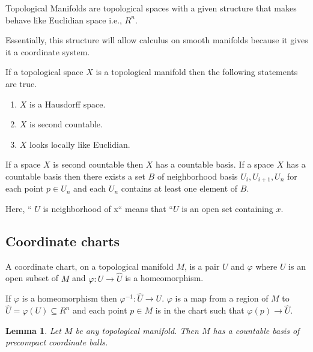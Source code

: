 \documentclass{article}
\newtheorem{lemma}[theorem]{Lemma}
\begin{document}
Topological Manifolds are topological spaces with a given structure that makes behave like Euclidian space i.e., $ R^n $.

Essentially, this structure will allow calculus on smooth manifolds because it gives it a coordinate system.

If a topological space $ X $ is a topological manifold then the following statements are true.

\begin{enumerate}
\item $ X $ is a Hausdorff space.
\item $ X $ is second countable.
\item $ X $ looks locally like Euclidian.
\end{enumerate}

If a space $ X $ is second countable then $ X $ has a countable basis. If a space $ X $ has a countable basis then there exists a set $ B $ of neighborhood basis $ U_{i}, U_{i+1}, U_{n} $ for each point $ p \in U_{n} $ and each $ U_{n} $ contains at least one element of $ B $.

Here, `` $ U $ is neighborhood of x`` means that ``$ U $ is an open set containing $ x $.

\subsection{Coordinate charts}
A coordinate chart, on a topological manifold $ M $, is a pair $ U $ and $ \varphi $ where $ U $ is an open subset of $ M $ and $ \varphi: U \rightarrow \hat{U} $ is a homeomorphism.

If $ \varphi $ is a homeomorphism then $  \varphi^{-1}: \hat{U} \rightarrow U $. $ \varphi $ is a map from a region of $ M $ to  $ \hat{U} = \varphi(U) \subseteq R^n $ and each point $ p \in M $ is in the chart such that $ \varphi(p) \rightarrow \hat{U} $.

\begin{lemma}
Let $ M $ be any topological manifold. Then $ M $ has a countable basis of precompact coordinate balls.
\end{lemma}
\end{document}
